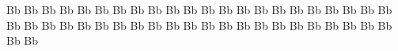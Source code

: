 \documentclass{worksheet}
\begin{document}
\begin{drillsheet}
\calligra
Bb Bb Bb Bb Bb Bb Bb Bb Bb Bb Bb Bb Bb Bb Bb Bb Bb Bb Bb Bb Bb Bb Bb Bb Bb Bb Bb Bb Bb Bb Bb Bb Bb Bb Bb Bb Bb Bb Bb Bb Bb Bb Bb Bb Bb Bb
\end{drillsheet}
\end{document}
